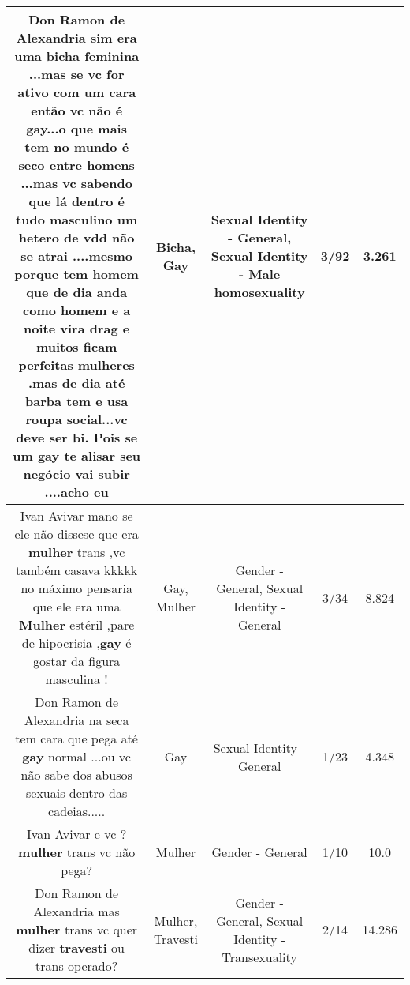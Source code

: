 \documentclass[11pt]{article}
\newlength\mylength
\begin{document}
\begin{center}
\begin{longtable}{|C{.65\mylength}|C{.30\mylength}|C{.12\mylength}|C{.12\mylength}|C{.12\mylength}|}
  \small Don Ramon de Alexandria sim era uma \textbf{bicha} feminina ...mas se vc for ativo com um cara então vc não é \textbf{gay}...o que mais tem no mundo é  seco entre homens ...mas vc sabendo que lá dentro é  tudo masculino um hetero de vdd não se atrai ....mesmo porque tem homem que de dia anda como homem e a noite vira drag e muitos ficam perfeitas mulheres .mas de dia até barba tem e usa roupa social...vc deve ser bi.  Pois se um \textbf{gay} te alisar seu negócio vai subir ....acho eu\normalsize   & Bicha, Gay & Sexual Identity - General, Sexual Identity - Male homosexuality & 3/92 & 3.261 \\  \hline
  \small Ivan Avivar mano se  ele não dissese que era \textbf{mulher} trans ,vc também casava kkkkk no máximo pensaria que ele era uma \textbf{Mulher} estéril ,pare de hipocrisia ,\textbf{gay} é gostar da figura masculina !\normalsize   & Gay, Mulher & Gender - General, Sexual Identity - General & 3/34 & 8.824 \\  \hline
  \small Don Ramon de Alexandria  na seca tem cara que pega até \textbf{gay} normal ...ou vc não sabe dos abusos sexuais dentro das cadeias.....\normalsize   & Gay & Sexual Identity - General & 1/23 & 4.348 \\  \hline
  \small Ivan Avivar e vc ? \textbf{mulher} trans vc não pega?\normalsize   & Mulher & Gender - General & 1/10 & 10.0 \\  \hline
  \small Don Ramon de Alexandria mas \textbf{mulher} trans vc quer dizer \textbf{travesti} ou trans operado?\normalsize   & Mulher, Travesti & Gender - General, Sexual Identity - Transexuality & 2/14 & 14.286 \\  \hline

\end{longtable}
\end{center}
\end{document}

